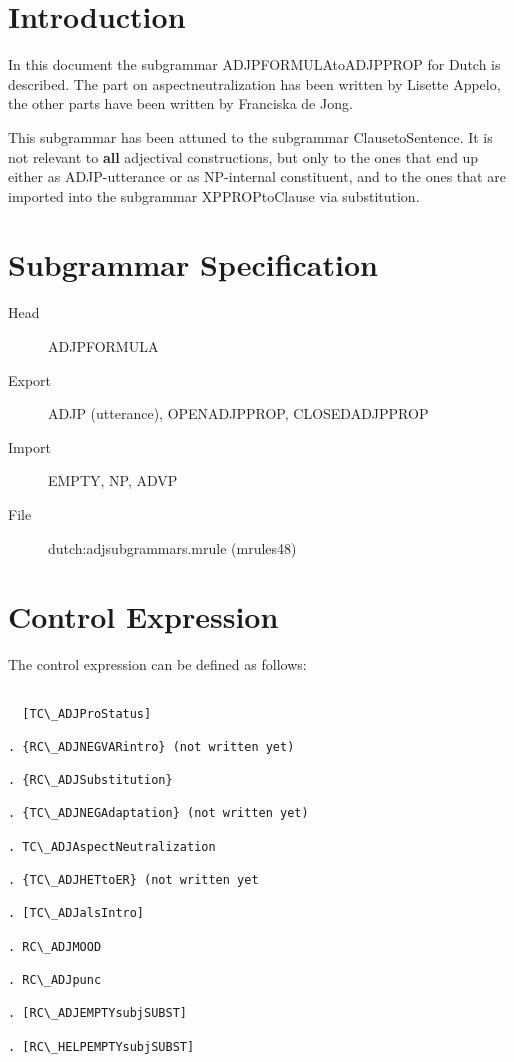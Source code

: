 
   \MakeRosTitle
%
%


\section{Introduction}

In this document the subgrammar ADJPFORMULAtoADJPPROP for Dutch is described.
The part on  aspectneutralization 
has been written by 
Lisette Appelo, the other parts have been written by Franciska de Jong.

This subgrammar has been attuned 
to the 
subgrammar ClausetoSentence.  It is not relevant to {\bf all} 
adjectival constructions, but only to the ones that end up  
either as ADJP-utterance or as NP-internal constituent, and to the ones that
are
imported 
into the subgrammar XPPROPtoClause via substitution.

\section{Subgrammar Specification}

\begin{description}
  \item[Head] ADJPFORMULA
  \item[Export] ADJP (utterance), OPENADJPPROP, CLOSEDADJPPROP
  \item[Import] EMPTY, NP, ADVP
  \item[File] dutch:adjsubgrammars.mrule (mrules48)
\end{description}

\section{Control Expression}
The control expression can be defined as follows:
\begin{verbatim}

  [TC\_ADJProStatus] 

. {RC\_ADJNEGVARintro} (not written yet)

. {RC\_ADJSubstitution}

. {TC\_ADJNEGAdaptation} (not written yet)

. TC\_ADJAspectNeutralization

. {TC\_ADJHETtoER} (not written yet

. [TC\_ADJalsIntro]

. RC\_ADJMOOD

. RC\_ADJpunc

. [RC\_ADJEMPTYsubjSUBST]      

. [RC\_HELPEMPTYsubjSUBST]   

\end{verbatim}

